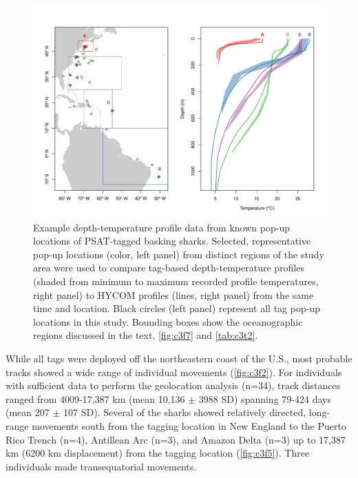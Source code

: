 \begin{figure}[t]
\centering
\includegraphics[width=1\textwidth]{images/C3_Fig1.pdf}
\caption[Comparison of depth-temperature profile data]{Example depth-temperature profile data from known pop-up locations of PSAT-tagged basking sharks. Selected, representative pop-up locations (color, left panel) from distinct regions of the study area were used to compare tag-based depth-temperature profiles (shaded from minimum to maximum recorded profile temperatures, right panel) to HYCOM profiles (lines, right panel) from the same time and location. Black circles (left panel) represent all tag pop-up locations in this study. Bounding boxes show the oceanographic regions discussed in the text, \cref{fig:c3f7} and \cref{tab:c3t2}.}
\label{fig:c3f1}
\end{figure}

While all tags were deployed off the northeastern coast of the U.S., most probable tracks showed a wide range of individual movements (\cref{fig:c3f2}). For individuals with sufficient data to perform the geolocation analysis (n=34), track distances ranged from 4009-17,387 km (mean 10,136 $\pm$ 3988 SD) spanning 79-424 days (mean 207 $\pm$ 107 SD). Several of the sharks showed relatively directed, long-range movements south from the tagging location in New England to the Puerto Rico Trench (n=4), Antillean Arc (n=3), and Amazon Delta (n=3) up to 17,387 km (6200 km displacement) from the tagging location (\cref{fig:c3f5}). Three individuals made transequatorial movements.

